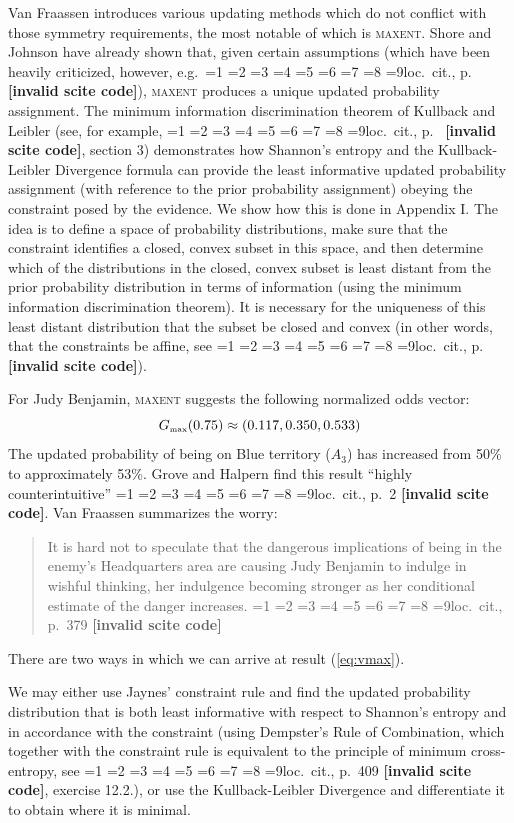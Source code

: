 \documentclass[12pt]{article}
\newcommand{\qeins}[1]{``#1''}
\newif\ifNumericalOrYear
\newcommand{\PageP}{p.~}
\newcommand{\PageP}{}
\newcommand{\nias}{\noindent} %
\newcommand{\scite}[3]{\ifnum#1=1\ifNumericalOrYear\citep{#2}\else\citeyearpar{#2}\fi\else
\ifnum#1=2\ifNumericalOrYear\citep[#3]{#2}\else\citep[{\PageP}#3]{#2}\fi\else
\ifnum#1=3\ifNumericalOrYear(\citet[#3]{#2})\else\citep[{\PageP}#3]{#2}\fi\else
\ifnum#1=4\ifNumericalOrYear\citet{#2}\else\citet{#2}\fi\else
\ifnum#1=5\ifNumericalOrYear(\citet{#2})\else\citep{#2}\fi\else
\ifnum#1=6\ifNumericalOrYear(\citet[#3]{#2})\else\citep[{\PageP}#3]{#2}\fi\else
\ifnum#1=7\ifNumericalOrYear\citep{#2}\else\citealp{#2}\fi\else
\ifnum#1=8\ifNumericalOrYear\citep[#3]{#2}\else\citealp[{\PageP}#3]{#2}\fi\else
\ifnum#1=9\ifNumericalOrYear\citep[#3]{#2}\else{}loc.\ cit., {\PageP}#3\fi\else
\textbf{[invalid scite code]}\fi\fi\fi\fi\fi\fi\fi\fi\fi}
\newenvironment{quotex}{\begin{quote}\begin{footnotesize}}{\end{footnotesize}\end{quote}}
\begin{document}
Van Fraassen introduces various updating methods which do not conflict
with those symmetry requirements, the most notable of which is
\textsc{maxent}. Shore and Johnson have already shown that, given
certain assumptions (which have been heavily criticized, however,
e.g.\ \scite{7}{uffink96}{}), \textsc{maxent} produces a unique
updated probability assignment. The minimum information discrimination
theorem of Kullback and Leibler (see, for example,
\scite{7}{csiszar67}{}, section 3) demonstrates how Shannon's entropy
and the Kullback-Leibler Divergence formula can provide the least
informative updated probability assignment (with reference to the
prior probability assignment) obeying the constraint posed by the
evidence. We show how this is done in Appendix I. The idea is to
define a space of probability distributions, make sure that the
constraint identifies a closed, convex subset in this space, and then
determine which of the distributions in the closed, convex subset is
least distant from the prior probability distribution in terms of
information (using the minimum information discrimination theorem). It
is necessary for the uniqueness of this least distant distribution
that the subset be closed and convex (in other words, that the
constraints be affine, see \scite{7}{csiszar67}{}).

For Judy Benjamin, \textsc{maxent} suggests the following normalized
odds vector:
\begin{equation}
  \label{eq:vmax}
  G_{\mbox{{\tiny max}}}(0.75)\approx(0.117,0.350,0.533)
\end{equation}
The updated probability of being on Blue territory ($A_{3}$) has
increased from 50\% to approximately 53\%. Grove and Halpern find this
result \qeins{highly counterintuitive} \scite{2}{grovehalpern97}{2}.
Van Fraassen summarizes the worry:
\begin{quotex}
  It is hard not to speculate that the dangerous implications of being
  in the enemy's Headquarters area are causing Judy Benjamin to
  indulge in wishful thinking, her indulgence becoming stronger as her
  conditional estimate of the danger increases. \scite{3}{fraassen81}{379}
\end{quotex}

\bigskip

\nias There are two ways in which we can arrive at result
({\ref{eq:vmax}}).

We may either use Jaynes' constraint rule and find the updated
probability distribution that is both least informative with respect
to Shannon's entropy and in accordance with the constraint (using
Dempster's Rule of Combination, which together with the constraint
rule is equivalent to the principle of minimum cross-entropy, see
\scite{8}{coverthomas06}{409}, exercise 12.2.), or use the
Kullback-Leibler Divergence and differentiate it to obtain where it is
minimal.
\end{document}
